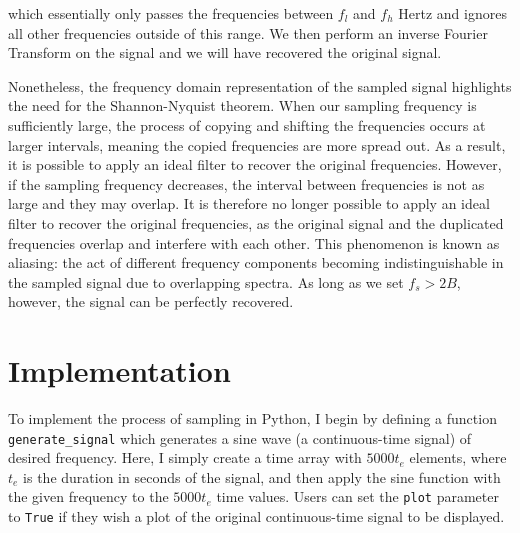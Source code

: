 \documentclass{article}
\begin{document}
which essentially only passes the frequencies between $f_l$ and $f_h$ Hertz and ignores all other frequencies outside of this range.
We then perform an inverse Fourier Transform on the signal and we will have recovered the original signal.

Nonetheless, the frequency domain representation of the sampled signal highlights the need for the Shannon-Nyquist theorem. %
When our sampling frequency is sufficiently large, the process of copying and shifting the frequencies occurs at larger intervals, meaning the copied frequencies are more spread out. 
As a result, it is possible to apply an ideal filter to recover the original frequencies. 
However, if the sampling frequency decreases, the interval between frequencies is not as large and they may overlap. It is therefore no longer possible to apply an ideal filter to recover the original frequencies, as the original signal and the duplicated frequencies overlap and interfere with each other.
This phenomenon is known as aliasing: the act of different frequency components becoming indistinguishable in the sampled signal due to overlapping spectra. %
As long as we set $f_s > 2B$, however, the signal can be perfectly recovered. 



\section{Implementation}


To implement the process of sampling in Python, I begin by defining a function \verb|generate_signal| which generates a sine wave (a continuous-time signal) of desired frequency.
Here, I simply create a time array with $5000t_e$ elements, where $t_e$ is the duration in seconds of the signal, 
and then apply the sine function with the given frequency to the $5000 t_e$ time values. 
Users can set the \verb|plot| parameter to \verb|True| if they wish a plot of the original continuous-time signal to be displayed.
\end{document}
